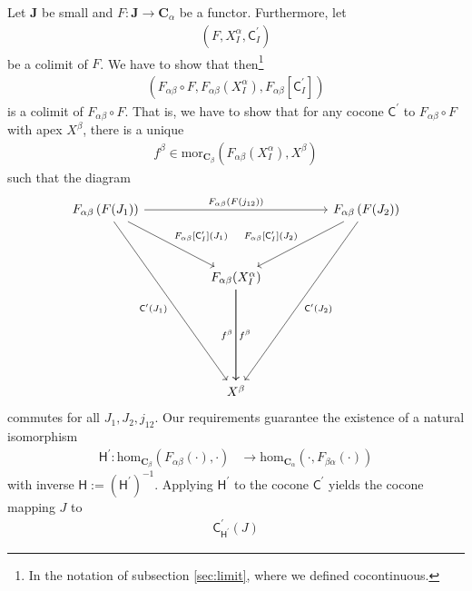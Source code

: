 \begin{prf}
Let $\mathbf{J}$ be small and $F \colon \mathbf{J} \rightarrow \mathbf{C}_{\alpha}$ be a functor.
Furthermore, let
\begin{align*}
  \left(
    F,
    X_{I}^{\alpha},
    \mathsf{C}_{I}^{\prime}
  \right)
\end{align*}
be a colimit of $F$.
We have to show that then\footnote{In the notation of subsection \ref{sec:limit}, where we defined cocontinuous.}
\begin{align*}
  \left(
    F_{\alpha\beta} \circ F,
    F_{\alpha\beta}(X_{I}^{\alpha}),
    F_{\alpha\beta}[\mathsf{C}_{I}^{\prime}]
  \right)
\end{align*}
is a colimit of $F_{\alpha\beta} \circ F$.
That is, we have to show that for any cocone $\mathsf{C}^{\prime}$ to $F_{\alpha\beta} \circ F$ with apex $X^{\beta}$, there is a unique
\begin{align*}
  f^{\beta}
  \in
  \mathrm{mor}_{\mathbf{C}_{\beta}}
  \left(
    F_{\alpha\beta}(X_{I}^{\alpha}),
    X^{\beta}
  \right)
\end{align*}
such that the diagram
\[
\begin{tikzcd}[sep=huge]
  F_{\alpha\beta}
  \left(
    F(J_{1})
  \right)
  \arrow{rr}{F_{\alpha\beta}(F(j_{12}))}
  \arrow{dr}{F_{\alpha\beta}[\mathsf{C}_{I}^{\prime}](J_{1})}
  \arrow[swap]{dddr}{\mathsf{C}^{\prime}(J_{1})}
  &
  &
  F_{\alpha\beta}
  \left(
    F(J_{2})
  \right)
  \arrow{dddl}{\mathsf{C}^{\prime}(J_{2})}
  \arrow[swap]{dl}{F_{\alpha\beta}[\mathsf{C}_{I}^{\prime}](J_{2})}
  \\
  &
  F_{\alpha\beta}(X_{I}^{\alpha})
  \arrow{dd}{f^{\beta}}
  \arrow[swap]{dd}{f^{\beta}}
  &
  \\
  \\
  &
  X^{\beta}
  &
\end{tikzcd}
\]
commutes for all $J_{1},J_{2},j_{12}$.
Our requirements guarantee the existence of a natural isomorphism
\begin{align*}
  \mathsf{H}^{\prime}
  \colon
  \mathrm{hom}_{\mathbf{C}_{\beta}}
  \left(
    F_{\alpha\beta}(\cdot),
    \cdot
  \right)
  &\rightarrow
  \mathrm{hom}_{\mathbf{C}_{\alpha}}
  \left(
    \cdot,
    F_{\beta\alpha}(\cdot)
  \right)
\end{align*}
with inverse $\mathsf{H} := (\mathsf{H}^{\prime})^{-1}$.
Applying $\mathsf{H}^{\prime}$ to the cocone $\mathsf{C}^{\prime}$ yields the cocone mapping $J$ to
\begin{align*}
  \mathsf{C}_{\mathsf{H}^{\prime}}^{\prime}(J)

\end{align*}
\end{prf}
